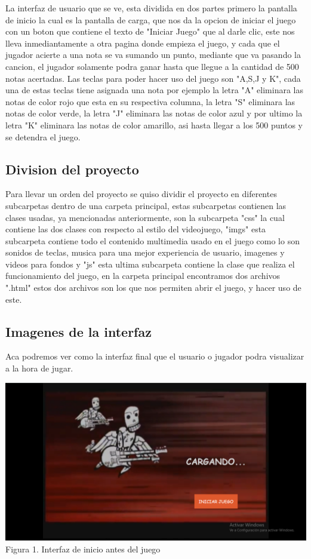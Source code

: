 \documentclass[conference]{IEEEtran}
\begin{document}
La interfaz de usuario que se ve, esta dividida en dos partes primero la pantalla de inicio la cual es la pantalla de carga, que nos da la opcion de iniciar el juego con un boton que contiene el texto de "Iniciar Juego" que al darle clic, este nos lleva inmediantamente a otra pagina donde empieza el juego, y cada que el jugador acierte a una nota se va sumando un punto, mediante que va pasando la cancion, el jugador solamente podra ganar hasta que llegue a la cantidad de 500 notas acertadas. 
Las teclas para poder hacer uso del juego son "A,S,J y K", cada una de estas teclas tiene asignada una nota por ejemplo la letra "A" eliminara las notas de color rojo que esta en su respectiva columna, la letra "S" eliminara las notas de color verde, la letra "J" eliminara las notas de color azul y por ultimo la letra "K" eliminara las notas de color amarillo, asi hasta llegar a los 500 puntos y se detendra el juego. 

\subsection{Division del proyecto }

Para llevar un orden del proyecto se quiso dividir el proyecto en diferentes subcarpetas dentro de una carpeta principal, estas subcarpetas contienen las clases usadas, ya mencionadas anteriormente, son la subcarpeta "css" la cual contiene las dos clases con respecto al estilo del videojuego, "imgs" esta subcarpeta contiene todo el contenido multimedia usado en el juego como lo son sonidos de teclas, musica para una mejor experiencia de usuario, imagenes y videos para fondos y "js" esta ultima subcarpeta contiene la clase que realiza el funcionamiento del juego, en la carpeta principal encontramos dos archivos ".html" estos dos archivos son los que nos permiten abrir el juego, y hacer uso de este. 
\subsection{Imagenes de la interfaz}
Aca podremos ver como la interfaz final que el usuario o jugador podra visualizar a la hora de jugar. 

\centering
\includegraphics[width=1\linewidth]{Inicio1.png}
Figura 1. Interfaz de inicio antes del juego
\end{document}
